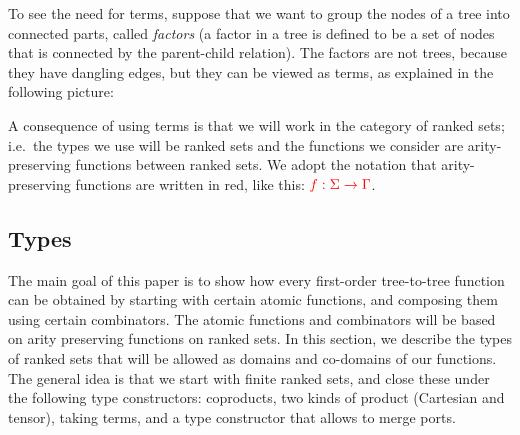To see the need for terms, suppose that we want to group the nodes of a tree into connected parts, called \emph{factors} (a factor in a tree is defined to be a set of nodes that is connected by the parent-child relation). The factors are not trees, because they have dangling edges, but they can be viewed as terms, as explained in the following picture:
        
A consequence of using terms is that we will work in the category of ranked sets; i.e.~the types we use will be ranked sets and the functions we consider are arity-preserving functions between ranked sets. We adopt the notation that arity-preserving functions are written in red, like this: ${\color{red}{f : \Sigma \to \Gamma}}$. 


\subsection{Types}
The  main goal of this paper is to  show how every first-order tree-to-tree function can be obtained by starting with certain atomic functions, and composing them using certain combinators. The atomic functions and combinators will be based on arity preserving functions on ranked sets. In this section, we describe the types of ranked sets that will be allowed as domains and co-domains of our functions. The general idea is that we start with finite ranked sets, and close these under the following type constructors: coproducts, two kinds of product (Cartesian and tensor), taking terms, and a type constructor that allows to merge ports.


